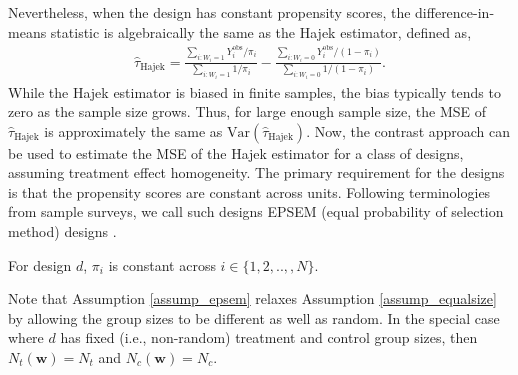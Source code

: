 \documentclass[12pt]{article}
\newcommand{\Var}{{\text{Var}}}
\begin{document}
Nevertheless, when the design has constant propensity scores, the difference-in-means statistic is algebraically the same as the Hajek estimator, defined as,
\begin{align}
    \hat{\tau}_{\text{Hajek}} = \frac{\sum_{i:W_i = 1}Y^{\text{obs}}_i/\pi_i}{\sum_{i:W_i = 1}1/{\pi_i}} - \frac{\sum_{i:W_i = 0}Y^{\text{obs}}_i/(1- \pi_i)}{\sum_{i:W_i = 0}1/(1 - \pi_i)}.
\end{align}
While the Hajek estimator is biased in finite samples, the bias typically tends to zero as the sample size grows. Thus, for large enough sample size, the MSE of $\hat{\tau}_{\text{Hajek}}$ is approximately the same as $\Var(\hat{\tau}_{\text{Hajek}})$. Now, the contrast approach can be used to estimate the MSE of the Hajek estimator for a class of designs, assuming treatment effect homogeneity. The primary requirement for the designs is that the propensity scores are constant across units. Following terminologies from sample surveys, we call such designs EPSEM (equal probability of selection method) designs \cite{kish1965survey}.
\begin{assumption}[EPSEM] \normalfont
    For design $d$, $\pi_i$ is constant across $i \in \{1,2,..,,N\}$. \label{assump_epsem}
\end{assumption}
Note that Assumption \ref{assump_epsem} relaxes Assumption \ref{assump_equalsize} by allowing the group sizes to be different as well as random. In the special case where $d$ has fixed (i.e., non-random) treatment and control group sizes, then $N_t(\bm{w}) = N_t$ and $N_c(\bm{w}) = N_c$. 
\end{document}
